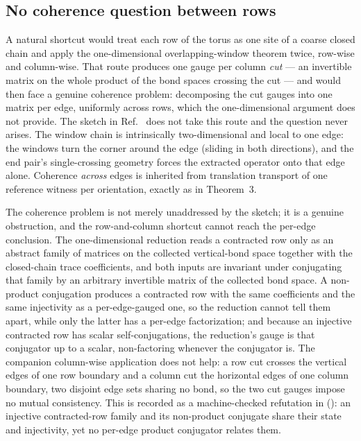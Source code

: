 \documentclass{article}
\begin{document}
\subsection{No coherence question between rows}

A natural shortcut would treat each row of the torus as one site of a
coarse closed chain and apply the one-dimensional overlapping-window
theorem twice, row-wise and column-wise. That route produces one gauge
per column \emph{cut} --- an invertible matrix on the whole product of
the bond spaces crossing the cut --- and would then face a genuine
coherence problem: decomposing the cut gauges into one matrix per edge,
uniformly across rows, which the one-dimensional argument does not
provide. The sketch in Ref.~\cite{Molnar2018NormalPEPS} does not take this route and the question
never arises. The window chain is intrinsically two-dimensional and
local to one edge: the windows turn the corner around the edge (sliding
in both directions), and the end pair's single-crossing geometry forces
the extracted operator onto that edge alone. Coherence \emph{across}
edges is inherited from translation transport of one reference witness
per orientation, exactly as in Theorem~3.

The coherence problem is not merely unaddressed by the sketch; it is a
genuine obstruction, and the row-and-column shortcut cannot reach the
per-edge conclusion. The one-dimensional reduction reads a contracted row
only as an abstract family of matrices on the collected vertical-bond space
together with the closed-chain trace coefficients, and both inputs are
invariant under conjugating that family by an arbitrary invertible matrix
of the collected bond space. A non-product conjugation produces a contracted
row with the same coefficients and the same injectivity as a per-edge-gauged
one, so the reduction cannot tell them apart, while only the latter has a
per-edge factorization; and because an injective contracted row has scalar
self-conjugations, the reduction's gauge is that conjugator up to a scalar,
non-factoring whenever the conjugator is. The companion column-wise
application does not help: a row cut crosses the vertical edges of one row
boundary and a column cut the horizontal edges of one column boundary, two
disjoint edge sets sharing no bond, so the two cut gauges impose no mutual
consistency. This is recorded as a machine-checked refutation in
():
an injective contracted-row family and its non-product conjugate share their
state and injectivity, yet no per-edge product conjugator relates them.
\end{document}
